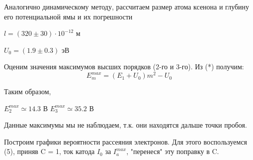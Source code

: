 \documentclass[12pt,a4paper]{article}
\begin{document}
Аналогично динамическому методу, рассчитаем размер атома ксенона и глубину его потенциальной ямы и их погрешности

\begin{large}
$l = (320 \pm 30) \cdot 10^{-12}$ м

$U_0 = (1.9 \pm 0.3)$ эВ
\end{large}

Оценим значения максимумов высших порядков (2-го и 3-го). Из (*) получим:
\begin{equation}
E^{max}_m = (E_1 + U_0)m^2 - U_0
\end{equation}

Таким образом,
\begin{center}
\begin{large}
$E_2^{max} \simeq 14.3$ В \;\;\;\;\;\;\;\; $E_3^{max} \simeq 35.2$ В
\end{large}
\end{center}

Данные максимумы мы не наблюдаем, т.к. они находятся дальше точки пробоя.

Построим графики вероятности рассеяния электронов. Для этого воспользуемся (5), приняв C = 1, ток катода $I_0$ за $I_a^{max}$, "перенеся" эту поправку в C.
\end{document}
